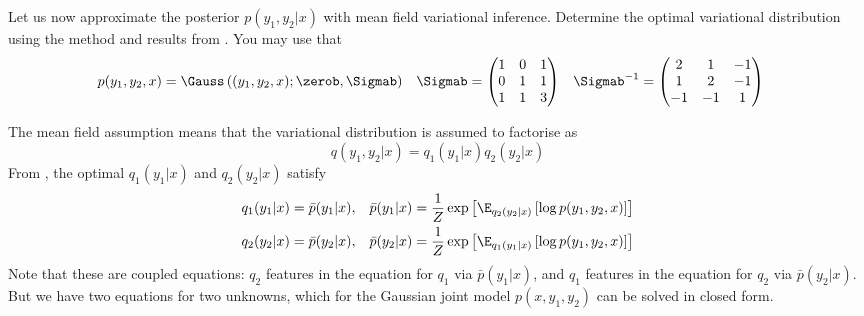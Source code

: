 \begin{exenumerate}
  Let us now approximate the posterior $p(y_1, y_2 | x)$ with mean
  field variational inference. Determine the optimal variational
  distribution using the method and results from . You may use that
  \begin{align}
    p(y_1, y_2, x) &= \Gauss\left( (y_1, y_2, x); \zerob, \Sigmab \right) &  \Sigmab &= \begin{pmatrix} 
      1 & 0 & 1\\
      0 & 1 & 1\\
      1 & 1 & 3
    \end{pmatrix}
    &
    \Sigmab^{-1} &= \begin{pmatrix} 
      2 & 1 & -1\\
      1 & 2 & -1\\
      -1 & -1 & 1
    \end{pmatrix}
  \end{align}
  
  \begin{solution}
    The mean field assumption means that the variational distribution is assumed to factorise as
    \begin{equation}
      q(y_1, y_2 | x) = q_1(y_1 | x) q_2(y_2 | x)
    \end{equation}
    From , the optimal $q_1(y_1|x)$ and $q_2(y_2|x)$ satisfy
     \begin{align}
       q_1(y_1|x) &=  \bar{p}(y_1|x), &  \bar{p}(y_1|x) &= \frac{1}{Z} \exp\left[ \E_{q_2(y_2|x)}\left[ \log p(y_1, y_2, x)\right] \right]\\
       q_2(y_2|x) &=  \bar{p}(y_2|x), &  \bar{p}(y_2|x) &= \frac{1}{Z} \exp\left[ \E_{q_1(y_1|x)}\left[ \log p(y_1, y_2, x)\right] \right]
     \end{align}
    Note that these are coupled equations: $q_2$ features in the
    equation for $q_1$ via $\bar{p}(y_1|x)$, and $q_1$ features in
    the equation for $q_2$ via $\bar{p}(y_2|x)$. But we have two
    equations for two unknowns, which for the Gaussian joint model
    $p(x, y_1, y_2)$ can be solved in closed form.


\end{solution}
\end{exenumerate}

